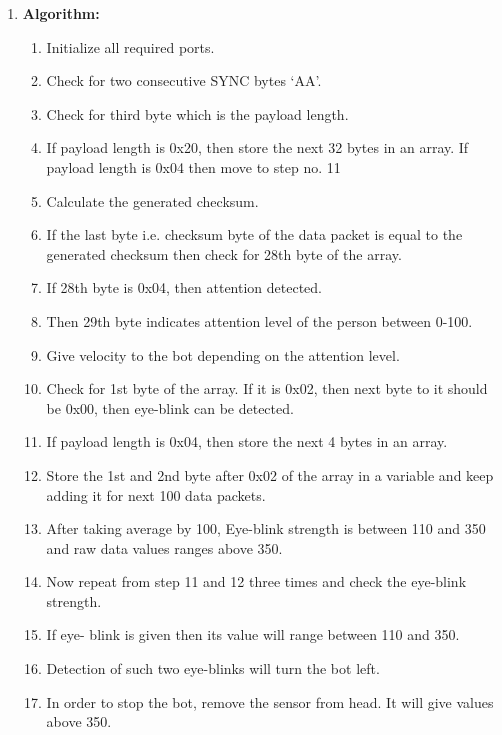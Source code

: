 \documentclass[12pt]{article}
\begin{document}
\begin{enumerate}
\begin{enumerate}
	\item \textbf{Algorithm:}
\begin{enumerate}
\item Initialize all required ports.
\item Check for two consecutive SYNC bytes ‘AA’.
\item Check for third byte which is the payload length.
\item If payload length is 0x20, then store the next 32 bytes in an array. If payload length is 0x04 then move to step no. 11
\item Calculate the generated checksum.
\item If the last byte i.e. checksum byte of the data packet is equal to the generated checksum then check for 28th byte of the array.
\item If 28th byte is 0x04, then attention detected.
\item Then 29th byte indicates attention level of the person between 0-100.
\item Give velocity to the bot depending on the attention level.
\item Check for 1st byte of the array. If it is 0x02, then next byte to it should be 0x00, then eye-blink can be detected.
\item If payload length is 0x04, then store the next 4 bytes in an array.
\item Store the 1st and 2nd byte after 0x02 of the array in a variable and keep adding it for next 100 data packets.
\item  After taking average by 100, Eye-blink strength is between 110 and 350 and raw data values ranges above 350.
\item Now repeat from step 11 and 12 three times and check the eye-blink strength.
\item If eye- blink is given then its value will range between 110 and 350. 
\item Detection of such two eye-blinks will turn the bot left.
\item In order to stop the bot, remove the sensor from head. It will give values above 350.
\end{enumerate}


\end{enumerate}
\end{enumerate}
\end{document}
